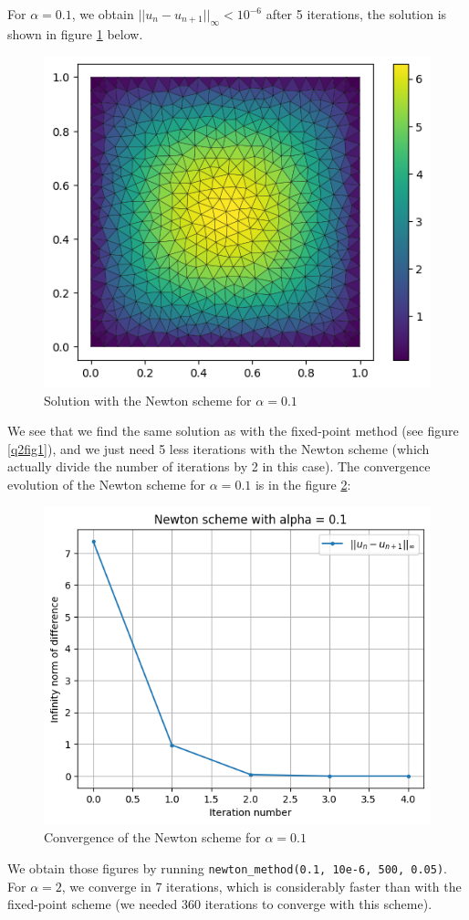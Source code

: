 \documentclass[11pt, a4paper, twoside]{article}
\begin{document}
For $\alpha = 0.1$, we obtain $||u_n -u_{n+1}||_\infty < 10^{-6}$ after 5 iterations, the solution is shown in figure \ref{q3fig1} below.
\begin{figure}[H]
\centering
\includegraphics[scale = 0.7]{../Figures/newt_sol_alpha0.1.png}
\caption{Solution with the Newton scheme for $\alpha=0.1$}
\label{q3fig1}
\end{figure}
We see that we find the same solution as with the fixed-point method (see figure \ref{q2fig1}), and we just need 5 less iterations with the Newton scheme (which actually divide the number of iterations by 2 in this case).
The convergence evolution of the Newton scheme for $\alpha=0.1$ is in the figure \ref{q3fig2}:
\begin{figure}[H]
\centering
\includegraphics[scale = 0.7]{../Figures/newt_conv_alpha0.1.png}
\caption{Convergence of the Newton scheme for $\alpha=0.1$}
\label{q3fig2}
\end{figure}
We obtain those figures by running \verb+newton_method(0.1, 10e-6, 500, 0.05)+.
For $\alpha=2$, we converge in 7 iterations, which is considerably faster than with the fixed-point scheme (we needed 360 iterations to converge with this scheme).
\end{document}
